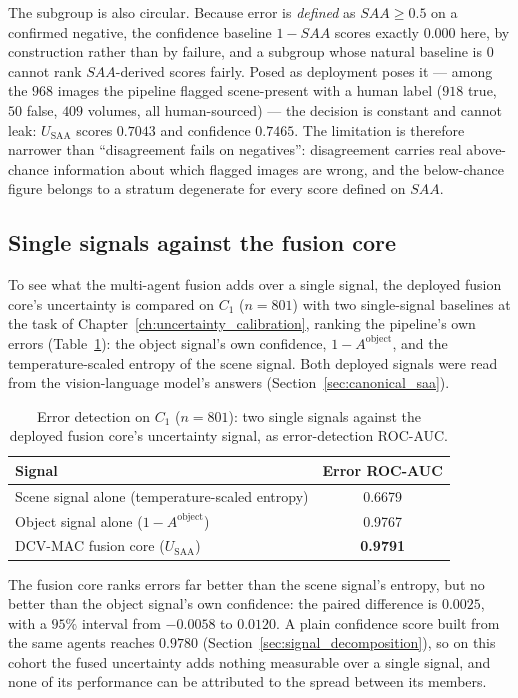 \documentclass[12pt,a4paper]{report}
\begin{document}
The subgroup is also circular. Because error is \emph{defined} as $SAA\ge0.5$ on a confirmed negative, the confidence baseline $1-SAA$ scores exactly $0.000$ here, by construction rather than by failure, and a subgroup whose natural baseline is $0$ cannot rank $SAA$-derived scores fairly. Posed as deployment poses it --- among the $968$ images the pipeline flagged scene-present with a human label ($918$ true, $50$ false, $409$ volumes, all human-sourced) --- the decision is constant and cannot leak: $U_{\text{SAA}}$ scores $0.7043$ and confidence $0.7465$. The limitation is therefore narrower than ``disagreement fails on negatives'': disagreement carries real above-chance information about which flagged images are wrong, and the below-chance figure belongs to a stratum degenerate for every score defined on $SAA$.

\subsection{Single signals against the fusion core}
\label{sec:moved_single}
To see what the multi-agent fusion adds over a single signal, the deployed fusion core's uncertainty is compared on $C_1$ ($n=801$) with two single-signal baselines at the task of Chapter~\ref{ch:uncertainty_calibration}, ranking the pipeline's own errors (Table~\ref{tab:mono_vs_fusion_benchmark}): the object signal's own confidence, $1-A^{\text{object}}$, and the temperature-scaled entropy of the scene signal. Both deployed signals were read from the vision-language model's answers (Section~\ref{sec:canonical_saa}).

\begin{table}[!htbp]
\centering
\caption[Error detection: single signals against the fusion core]{Error detection on $C_1$ ($n=801$): two single signals against the deployed fusion core's uncertainty signal, as error-detection ROC-AUC.}
\label{tab:mono_vs_fusion_benchmark}
\begin{tabular}{lc}
\toprule
\textbf{Signal} & \textbf{Error ROC-AUC} \\
\midrule
Scene signal alone (temperature-scaled entropy) & 0.6679 \\
Object signal alone ($1-A^{\text{object}}$) & 0.9767 \\
DCV-MAC fusion core ($U_{\text{SAA}}$) & \textbf{0.9791} \\
\bottomrule
\end{tabular}
\end{table}

The fusion core ranks errors far better than the scene signal's entropy, but no better than the object signal's own confidence: the paired difference is $0.0025$, with a $95\%$ interval from $-0.0058$ to $0.0120$. A plain confidence score built from the same agents reaches $0.9780$ (Section~\ref{sec:signal_decomposition}), so on this cohort the fused uncertainty adds nothing measurable over a single signal, and none of its performance can be attributed to the spread between its members.
\end{document}
